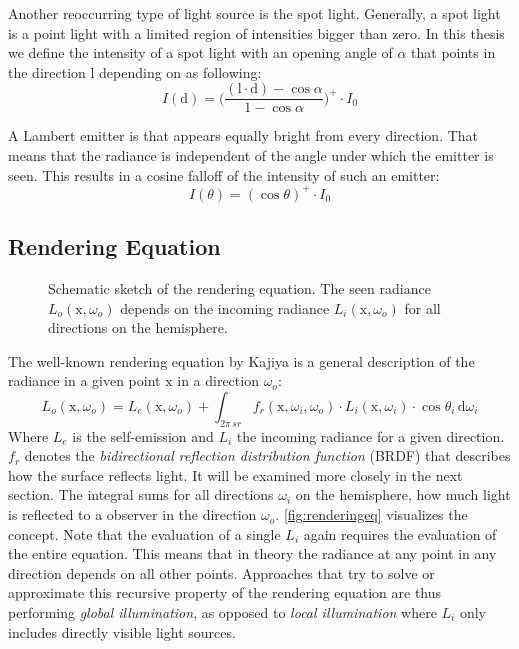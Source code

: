 \documentclass[thesis.tex]{subfiles}
\begin{document}
Another reoccurring type of light source is the spot light.
Generally, a spot light is a point light with a limited region of intensities bigger than zero.
In this thesis we define the intensity of a spot light with an opening angle of $\alpha$ that points in the direction $\mathrm{l}$ depending on as following:
\begin{equation}
I(\mathrm{d}) = \Big(\frac{(\mathrm{l} \cdot \mathrm{d}) - \cos\alpha }{1-\cos\alpha}\Big)^+ \cdot I_0
\end{equation}

A Lambert emitter is that appears equally bright from every direction.
That means that the radiance is independent of the angle under which the emitter is seen.
This results in a cosine falloff of the intensity of such an emitter:
\begin{equation}
I(\theta) = (\cos\theta)^+ \cdot I_0
\end{equation}

\subsection{Rendering Equation}
\begin{figure}[h]
\centering
{}
\caption{Schematic sketch of the rendering equation. The seen radiance $L_o(\mathrm{x}, \omega_o)$ depends on the incoming radiance $L_i(\mathrm{x}, \omega_o)$ for all directions on the hemisphere.}
\label{fig:renderingeq}
\end{figure}
The well-known rendering equation by Kajiya \cite{bib:renderingequation} is a general description of the radiance in a given point $\mathrm{x}$ in a direction $\omega_o$:
\begin{equation}
L_o(\mathrm{x}, \omega_o) = L_e(\mathrm{x}, \omega_o) + \int_{2\pi\,sr} f_r(\mathrm{x}, \omega_i, \omega_o) \cdot L_i(\mathrm{x}, \omega_i) \cdot \cos\theta_i \, \mathrm{d}\omega_i
\end{equation}
Where $L_e$ is the self-emission and $L_i$ the incoming radiance for a given direction.
$f_r$ denotes the \emph{bidirectional reflection distribution function} (BRDF) that describes how the surface reflects light.
It will be examined more closely in the next section.
The integral sums for all directions $\omega_i$ on the hemisphere, how much light is reflected to a observer in the direction $\omega_o$.
\autoref{fig:renderingeq} visualizes the concept.
Note that the evaluation of a single $L_i$ again requires the evaluation of the entire equation.
This means that in theory the radiance at any point in any direction depends on all other points.
Approaches that try to solve or approximate this recursive property of the rendering equation are thus performing \emph{global illumination}, as opposed to \emph{local illumination} where $L_i$ only includes directly visible light sources.
\end{document}
